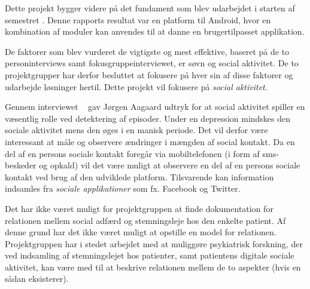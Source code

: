 Dette projekt bygger videre på det fundament som blev udarbejdet i starten af semestret \citefaelles{}.
Denne rapports resultat var en platform til Android, hvor en kombination af moduler kan anvendes til at danne en brugertilpasset applikation.

De faktorer som blev vurderet de vigtigste og mest effektive, baseret på de to personinterviews samt fokusgruppeinterviewet, er søvn og social aktivitet.
De to projektgrupper har derfor besluttet at fokusere på hver sin af disse faktorer og udarbejde løsninger hertil.
Dette projekt vil fokusere på \emph{social aktivitet}.

Gennem interviewet ~ gav Jørgen Aagaard udtryk for at social aktivitet spiller en væsentlig rolle ved detektering af episoder.
Under en depression mindskes den sociale aktivitet mens den øges i en manisk periode.
Det vil derfor være interessant at måle og observere ændringer i mængden af social kontakt.
Da en del af en persons sociale kontakt foregår via mobiltelefonen (i form af sms-beskeder og opkald) vil det være muligt at observere en del af en persons sociale kontakt ved brug af den udviklede platform.
Tilsvarende kan information indsamles fra \textit{sociale applikationer} som fx. Facebook og Twitter.

Det har ikke været muligt for projektgruppen at finde dokumentation for relationen mellem social adfærd og stemningsleje hos den enkelte patient.
Af denne grund har det ikke været muligt at opstille en model for relationen.
Projektgruppen har i stedet arbejdet med at muliggøre psykiatrisk forskning, der ved indsamling af stemningslejet hos patienter, samt patientens digitale sociale aktivitet, kan være med til at beskrive relationen mellem de to aspekter (hvis en sådan eksisterer).
